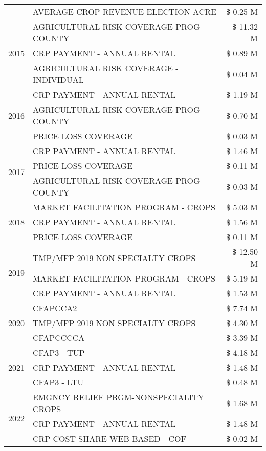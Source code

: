 \begin{tabular}{llr}
 & AVERAGE CROP REVENUE ELECTION-ACRE & \$ 0.25 M \\
\cline{1-3}
\multirow[t]{3}{*}{2015} & AGRICULTURAL RISK COVERAGE PROG - COUNTY & \$ 11.32 M \\
 & CRP PAYMENT - ANNUAL RENTAL & \$ 0.89 M \\
 & AGRICULTURAL RISK COVERAGE - INDIVIDUAL & \$ 0.04 M \\
\cline{1-3}
\multirow[t]{3}{*}{2016} & CRP PAYMENT - ANNUAL RENTAL & \$ 1.19 M \\
 & AGRICULTURAL RISK COVERAGE PROG - COUNTY & \$ 0.70 M \\
 & PRICE LOSS COVERAGE & \$ 0.03 M \\
\cline{1-3}
\multirow[t]{3}{*}{2017} & CRP PAYMENT - ANNUAL RENTAL & \$ 1.46 M \\
 & PRICE LOSS COVERAGE & \$ 0.11 M \\
 & AGRICULTURAL RISK COVERAGE PROG - COUNTY & \$ 0.03 M \\
\cline{1-3}
\multirow[t]{3}{*}{2018} & MARKET FACILITATION PROGRAM - CROPS & \$ 5.03 M \\
 & CRP PAYMENT - ANNUAL RENTAL & \$ 1.56 M \\
 & PRICE LOSS COVERAGE & \$ 0.11 M \\
\cline{1-3}
\multirow[t]{3}{*}{2019} & TMP/MFP 2019 NON SPECIALTY CROPS & \$ 12.50 M \\
 & MARKET FACILITATION PROGRAM - CROPS & \$ 5.19 M \\
 & CRP PAYMENT - ANNUAL RENTAL & \$ 1.53 M \\
\cline{1-3}
\multirow[t]{3}{*}{2020} & CFAPCCA2 & \$ 7.74 M \\
 & TMP/MFP 2019 NON SPECIALTY CROPS & \$ 4.30 M \\
 & CFAPCCCCA & \$ 3.39 M \\
\cline{1-3}
\multirow[t]{3}{*}{2021} & CFAP3 - TUP & \$ 4.18 M \\
 & CRP PAYMENT - ANNUAL RENTAL & \$ 1.48 M \\
 & CFAP3 - LTU & \$ 0.48 M \\
\cline{1-3}
\multirow[t]{3}{*}{2022} & EMGNCY RELIEF PRGM-NONSPECIALITY CROPS & \$ 1.68 M \\
 & CRP PAYMENT - ANNUAL RENTAL & \$ 1.48 M \\
 & CRP COST-SHARE WEB-BASED - COF & \$ 0.02 M \\
\cline{1-3}
\bottomrule
\end{tabular}
